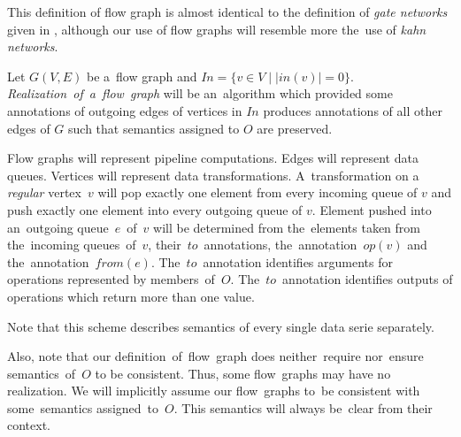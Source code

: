 This definition of flow graph is almost identical to the definition of \emph{gate networks} given in \cite{ads}, although our use of flow graphs will resemble more the~use of \emph{kahn networks}.

\begin{define}
  Let $G(V,E)$ be a~flow graph and ${In = \{v \in V \mid |in(v)| = 0\}}$. \emph{Realization~of~a~flow~graph} will be an~algorithm which provided some annotations of outgoing edges of vertices in $In$ produces annotations of all other edges of $G$ such that semantics assigned to $O$ are preserved. 
\end{define}

  Flow graphs will represent pipeline computations. Edges will represent data queues. Vertices will represent data transformations. A~transformation on a \emph{regular} vertex~$v$ will pop exactly one element from every incoming queue of $v$ and push exactly one element into every outgoing queue of $v$. Element pushed into an~outgoing queue~$e$~of~$v$ will be determined from the~elements taken from the~incoming queues~of~$v$, their~$to$~annotations, the~annotation~$op(v)$ and the~annotation~$from(e)$. The~$to$~annotation identifies arguments for operations represented by members~of~$O$. The~$to$~annotation identifies outputs of operations which return more than one value.

\parspace

Note that this scheme describes semantics of every single data serie separately. 

\parspace

Also, note that our definition~of~flow~graph does neither~require nor~ensure semantics~of~$O$ to be consistent. Thus, some flow~graphs may have no realization. We will implicitly assume our flow~graphs to~be consistent with some~semantics assigned~to~$O$. This semantics will always be~clear from their context.

